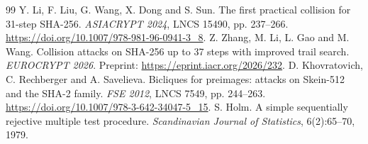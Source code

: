 \documentclass[11pt]{article}
\begin{document}
\begin{thebibliography}{99}
 Y. Li, F. Liu, G. Wang, X. Dong and S. Sun. The first practical collision for 31-step SHA-256. \emph{ASIACRYPT 2024}, LNCS 15490, pp. 237--266. \url{https://doi.org/10.1007/978-981-96-0941-3_8}.
 Z. Zhang, M. Li, L. Gao and M. Wang. Collision attacks on SHA-256 up to 37 steps with improved trail search. \emph{EUROCRYPT 2026}. Preprint: \url{https://eprint.iacr.org/2026/232}.
 D. Khovratovich, C. Rechberger and A. Savelieva. Bicliques for preimages: attacks on Skein-512 and the SHA-2 family. \emph{FSE 2012}, LNCS 7549, pp. 244--263. \url{https://doi.org/10.1007/978-3-642-34047-5_15}.
 S. Holm. A simple sequentially rejective multiple test procedure. \emph{Scandinavian Journal of Statistics}, 6(2):65--70, 1979.
\end{thebibliography}
\end{document}
